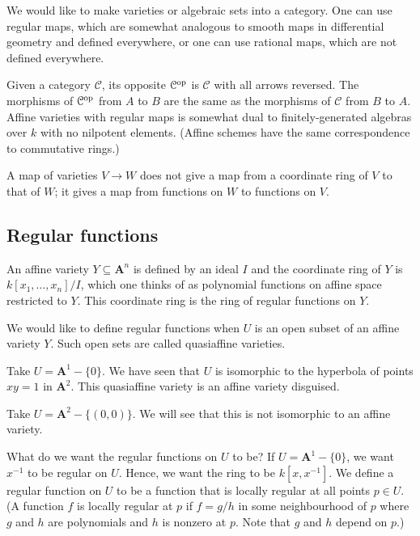 \documentclass [11 pt, oneside, margin = 1 in] {article}
\begin{document}
We would like to make varieties or algebraic sets into a category. One can use regular maps, which are somewhat analogous to smooth maps in differential geometry and defined everywhere, or one can use rational maps, which are not defined everywhere.

Given a category $\mathcal{C} $, its opposite $\mathcal{C}\textsuperscript{op}$ is $\mathcal{C} $ with all arrows reversed. The morphisms of ${\mathcal{C}}\textsuperscript{op} $ from $A$ to $B$ are the same as the morphisms of $\mathcal{C} $ from $B$ to $A$. Affine varieties with regular maps is somewhat dual to finitely-generated algebras over $k$ with no nilpotent elements. (Affine schemes have the same correspondence to commutative rings.)

A map of varieties $V\longrightarrow W$ does not give a map from a coordinate ring of $V$ to that of $W$; it gives a map from functions on $W$ to functions on $V$.


\subsection{Regular functions}
An affine variety $Y\subseteq \mathbf{A}^n$ is defined by an ideal $I$ and the coordinate ring of $Y$ is $k[x_1,\hdots,x_n]/I$, which one thinks of as polynomial functions on affine space restricted to $Y$. This coordinate ring is the ring of regular functions on $Y$.

We would like to define regular functions when $U$ is an open subset of an affine variety $Y$. Such open sets are called quasiaffine varieties.

\begin{example}\label{}\text{}
Take $U=\mathbf{A}^1-\{0\}$. We have seen that $U$ is isomorphic to the hyperbola of points $xy=1$ in $\mathbf{A}^2$. This quasiaffine variety is an affine variety disguised.

Take $U=\mathbf{A}^2-\{(0,0)\}$. We will see that this is not isomorphic to an affine variety.
\end{example}

What do we want the regular functions on $U$ to be? If $U=\mathbf{A}^1-\{0\}$, we want $x^{-1}$ to be regular on $U$. Hence, we want the ring to be $k[x,x^{-1}]$. We define a regular function on $U$ to be a function that is locally regular at all points $p\in U$. (A function $f$ is locally regular at $p$ if $f=g/h$ in some neighbourhood of $p$ where $g$ and $h$ are polynomials and $h$ is nonzero at $p$. Note that $g$ and $h$ depend on $p$.) 
\end{document}
